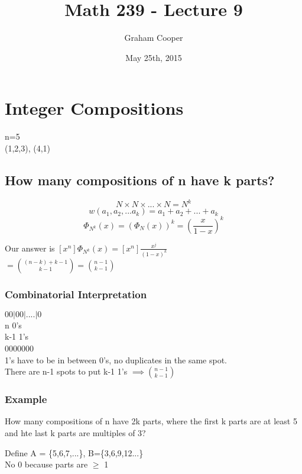 \documentclass[12pt]{article}
\title{\vspace{-15ex}Math 239 - Lecture 9\vspace{-1ex}}
\date{May 25th, 2015}
\author{Graham Cooper}
\begin{document}
	\maketitle
	
	\section*{Integer Compositions}
	
	n=5\\
	(1,2,3), (4,1)\\
	
	\subsection*{How many compositions of n have k parts?}
	
	$$N \times N \times ... \times N = N^k$$
	$$w(a_1, a_2, ... a_k) = a_1 + a_2 + ... + a_k$$
	$$\Phi_{N^k}(x) = (\Phi_N(x))^k = (\frac{x}{1-x})^k$$
	
	Our answer is $[x^n]\Phi_{N^k}(x) = [x^n]\frac{x^j}{(1-x)^k}$\\
	$= {(n-k)+k-1 \choose k-1} = {n-1 \choose k-1}$\\
	
	\subsubsection*{Combinatorial Interpretation}
	
	$00|00|....|0$\\
	n 0's\\
	k-1 1's\\
	
	0000000\\
	1's have to be in between 0's, no duplicates in the same spot.\\
	
	There are n-1 spots to put k-1  1's $\implies {n-1 \choose k-1}$\\
	
	\subsubsection*{Example}
	
	How many compositions of n have 2k parts, where the first k parts are at least 5 and hte last k parts are multiples of 3?
	
	Define A = \{5,6,7,...\}, B=\{3,6,9,12...\}\\
	No 0 because parts are $\geq$ 1\\
	
\end{document}
